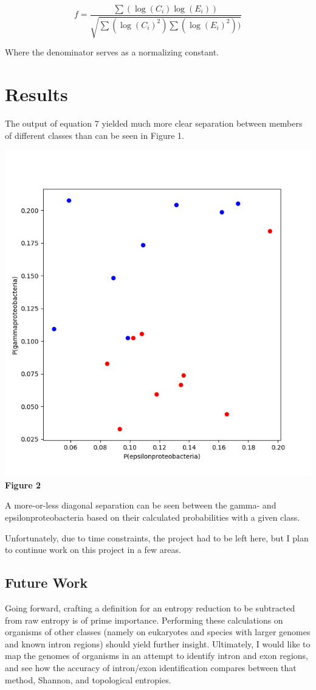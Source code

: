\documentclass[11pt, letterpaper, twocolumn]{article}
\begin{document}
	\begin{equation}
		f = \frac{\sum( \log(C_{i})  \log(E_{i}) )}{\sqrt{\sum(\log(C_{i})^{2})    \sum(\log(E_{i})^{2}))}}
	\end{equation}

	Where the denominator serves as a normalizing constant.
	
	\section{Results}
	The output of equation $7$ yielded much more clear separation between members of different classes than can be seen in Figure 1.
	
	\begin{center}
			\includegraphics[scale=0.5]{func_test_2.png}
			\small{\textbf{Figure 2}}
	\end{center}

	A more-or-less diagonal separation can be seen between the gamma- and epsilonproteobacteria based on their calculated probabilities with a given class.
	
	Unfortunately, due to time constraints, the project had to be left here, but I plan to continue work on this project in a few areas.
	
	\subsection{Future Work}
	Going forward, crafting a definition for an entropy reduction to be subtracted from raw entropy is of prime importance. Performing these calculations on organisms of other classes (namely on eukaryotes and species with larger genomes and known intron regions) should yield further insight. Ultimately, I would like to map the genomes of organisms in an attempt to identify intron and exon regions, and see how the accuracy of intron/exon identification compares between that method, Shannon, and topological entropies.
\end{document}
